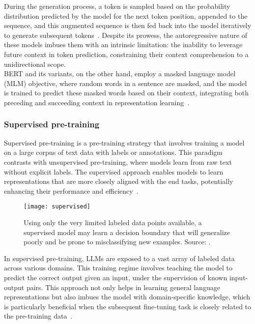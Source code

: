 During the generation process, a token is sampled based on the probability distribution predicted by the model for the next token position, appended to the sequence, and this augmented sequence is then fed back into the model iteratively to generate subsequent tokens~\cite{brown2020language}.
Despite its prowess, the autoregressive nature of these models imbues them with an intrinsic limitation: the inability to leverage future context in token prediction, constraining their context comprehension to a unidirectional scope.\\
BERT and its variants, on the other hand, employ a masked language model (MLM) objective, where random words in a sentence are masked, and the model is trained to predict these masked words based on their context, integrating both preceding and succeeding context in representation learning~\cite{devlin2019bert}.


\subsubsection{Supervised pre-training}
\label{subsubsec:supervised-pre-training}

Supervised pre-training is a pre-training strategy that involves training a model on a large corpus of text data with labels or annotations.
This paradigm contrasts with unsupervised pre-training, where models learn from raw text without explicit labels.
The supervised approach enables models to learn representations that are more closely aligned with the end tasks, potentially enhancing their performance and efficiency~\cite{gururangan2020don}.

\begin{figure}[h]
	\centering
	\texttt{[image: supervised]}
	\caption{Using only the very limited labeled data points available, a supervised model may learn a decision boundary that will generalize poorly and be prone to misclassifying new examples. Source: \textcite{bergmann2023semi}.}
	\label{fig:supervised}
\end{figure}

In supervised pre-training, LLMs are exposed to a vast array of labeled data across various domains.
This training regime involves teaching the model to predict the correct output given an input, under the supervision of known input-output pairs.
This approach not only helps in learning general language representations but also imbues the model with domain-specific knowledge, which is particularly beneficial when the subsequent fine-tuning task is closely related to the pre-training data~\cite{phang2019sentence}.

